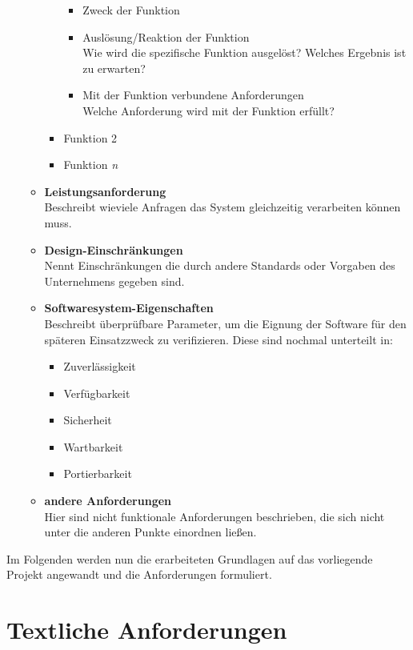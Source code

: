 \begin{itemize}
\begin{itemize}
\begin{itemize}
			\begin{itemize}
				\item Zweck der Funktion
				\item Auslösung/Reaktion der Funktion \\
				Wie wird die spezifische Funktion ausgelöst? Welches Ergebnis ist zu erwarten?
				\item Mit der Funktion verbundene Anforderungen\\
				Welche Anforderung wird mit der Funktion erfüllt?
			\end{itemize}
			\item Funktion 2
			\item Funktion \textit{n}
		\end{itemize}
	\item \textbf{Leistungsanforderung} \\
	Beschreibt \zb wieviele  Anfragen das System gleichzeitig verarbeiten können muss.
	\item \textbf{Design-Einschränkungen} \\
	Nennt Einschränkungen die durch andere Standards oder Vorgaben des Unternehmens gegeben sind.
	\item \textbf{Softwaresystem-Eigenschaften} \\
	Beschreibt überprüfbare Parameter, um die Eignung der Software für den späteren Einsatzzweck zu verifizieren. Diese sind nochmal unterteilt in:
	\begin{itemize}
		\item Zuverlässigkeit
		\item Verfügbarkeit
		\item Sicherheit
		\item Wartbarkeit
		\item Portierbarkeit
	\end{itemize} 
	\item \textbf{andere Anforderungen} \\
	Hier sind nicht funktionale Anforderungen beschrieben, die sich nicht unter die anderen Punkte einordnen ließen.
	\end{itemize}

\end{itemize}

Im Folgenden werden nun die erarbeiteten Grundlagen auf das vorliegende Projekt angewandt und die Anforderungen formuliert. 

\section{Textliche Anforderungen}
\label{sec:textAnf}


